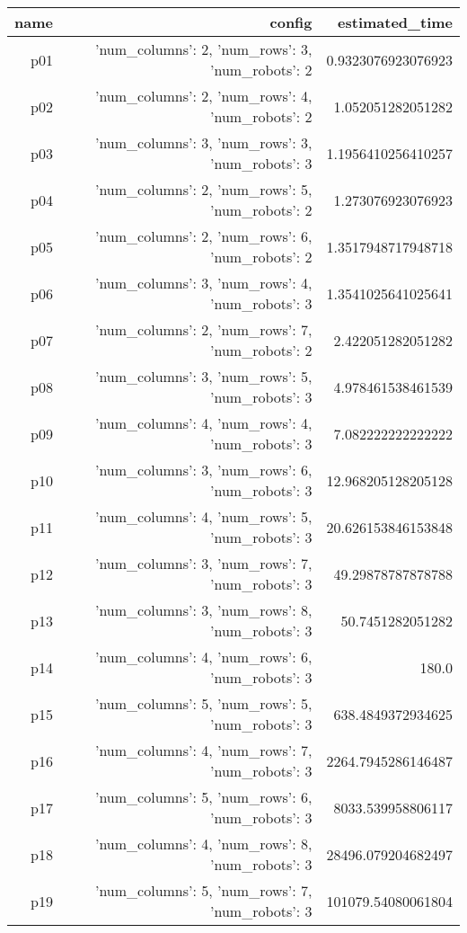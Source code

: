 \documentclass{article}
\begin{document}
                            \begin{center}
                            \scriptsize
                            \begin{tabular}{r|r|r}
                            name & config & estimated\_time\\\midrule
                              p01&{'num\_columns': 2, 'num\_rows': 3, 'num\_robots': 2}&0.9323076923076923\\
  p02&{'num\_columns': 2, 'num\_rows': 4, 'num\_robots': 2}&1.052051282051282\\
  p03&{'num\_columns': 3, 'num\_rows': 3, 'num\_robots': 3}&1.1956410256410257\\
  p04&{'num\_columns': 2, 'num\_rows': 5, 'num\_robots': 2}&1.273076923076923\\
  p05&{'num\_columns': 2, 'num\_rows': 6, 'num\_robots': 2}&1.3517948717948718\\
  p06&{'num\_columns': 3, 'num\_rows': 4, 'num\_robots': 3}&1.3541025641025641\\
  p07&{'num\_columns': 2, 'num\_rows': 7, 'num\_robots': 2}&2.422051282051282\\
  p08&{'num\_columns': 3, 'num\_rows': 5, 'num\_robots': 3}&4.978461538461539\\
  p09&{'num\_columns': 4, 'num\_rows': 4, 'num\_robots': 3}&7.082222222222222\\
  p10&{'num\_columns': 3, 'num\_rows': 6, 'num\_robots': 3}&12.968205128205128\\
  p11&{'num\_columns': 4, 'num\_rows': 5, 'num\_robots': 3}&20.626153846153848\\
  p12&{'num\_columns': 3, 'num\_rows': 7, 'num\_robots': 3}&49.29878787878788\\
  p13&{'num\_columns': 3, 'num\_rows': 8, 'num\_robots': 3}&50.7451282051282\\
  p14&{'num\_columns': 4, 'num\_rows': 6, 'num\_robots': 3}&180.0\\
  p15&{'num\_columns': 5, 'num\_rows': 5, 'num\_robots': 3}&638.4849372934625\\
  p16&{'num\_columns': 4, 'num\_rows': 7, 'num\_robots': 3}&2264.7945286146487\\
  p17&{'num\_columns': 5, 'num\_rows': 6, 'num\_robots': 3}&8033.539958806117\\
  p18&{'num\_columns': 4, 'num\_rows': 8, 'num\_robots': 3}&28496.079204682497\\
  p19&{'num\_columns': 5, 'num\_rows': 7, 'num\_robots': 3}&101079.54080061804\\

\end{tabular}
\end{center}
\end{document}
